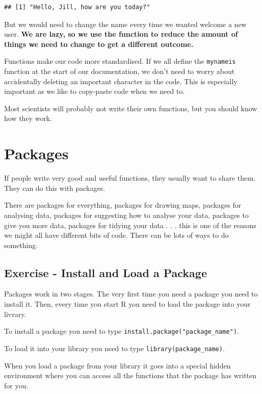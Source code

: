 \documentclass[
]{book}
\begin{document}
\begin{verbatim}
## [1] "Hello, Jill, how are you today?"
\end{verbatim}

But we would need to change the name every time we wanted welcome a new user. \textbf{We are lazy, so we use the function to reduce the amount of things we need to change to get a different outcome.}

Functions make our code more standardised. If we all define the \texttt{mynameis} function at the start of our documentation, we don't need to worry about accidentally deleting an important character in the code. This is especially important as we like to copy-paste code when we need to.

Most scientists will probably not write their own functions, but you should know how they work.

\hypertarget{packages}{%
\section{Packages}\label{packages}}

If people write very good and useful functions, they usually want to share them. They can do this with packages.

There are packages for everything, packages for drawing maps, packages for analysing data, packages for suggesting how to analyse your data, packages to give you more data, packages for tidying your data . . . this is one of the reasons we might all have different bits of code. There can be lots of ways to do something.

\hypertarget{ex_packages}{%
\subsection{Exercise - Install and Load a Package}\label{ex_packages}}

Packages work in two stages. The very first time you need a package you need to install it. Then, every time you start R you need to load the package into your livrary.

To install a package you need to type \texttt{install.package("package\_name")}.

To load it into your library you need to type \texttt{library(package\_name)}.

When you load a package from your library it goes into a special hidden environment where you can access all the functions that the package has written for you.
\end{document}
